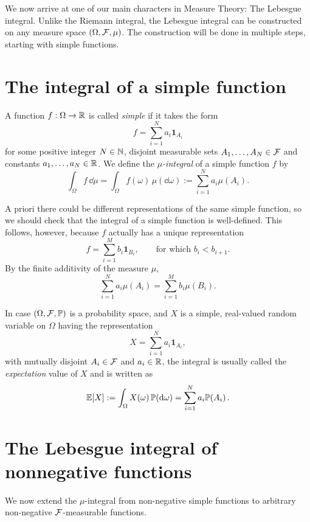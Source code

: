 We now arrive at one of our main characters in Measure Theory: The Lebesgue integral. Unlike the Riemann integral, the Lebesgue integral can be constructed on any measure space $(\Omega,\mathcal F,\mu)$. The construction will be done in multiple steps, starting with simple functions.

\section{The integral of a simple function}\label{sec:integral_simple_functions}

\begin{definition}
	A function $f: \Omega \to \mathbb R$ is called \emph{simple} if it takes the form
	\[
	f = \sum_{i=1}^N a_i \mathbf{1}_{A_i}
	\]
	for some positive integer $N \in \mathbb N$, disjoint measurable sets $A_1, \ldots, A_N \in \mathcal F$ and constants $a_1, \dots, a_N  \in \mathbb R$. We define the \emph{$\mu$-integral} of a simple function $f$ by
	\[
		\int_\Omega f\, \dd \mu = \int_\Omega f(\omega)\,\mu(\dd\omega) := \sum_{i = 1}^N a_i \mu(A_i).
	\]
\end{definition}

A priori there could be different representations of the same simple function, so we should check that the integral of a simple function is well-defined. 
This follows, however, because $f$ actually has a unique representation 
\[
	f = \sum_{i=1}^M b_i \mathbf{1}_{B_i},\qquad \text{for which $b_i < b_{i+1}$}.
\]
By the finite additivity of the measure $\mu$,
\[
\sum_{i=1}^N a_i \mu(A_i) = \sum_{i=1}^M b_i \mu(B_i).
\]

\begin{remark}
	In case $(\Omega, \mathcal F, \mathbb P)$ is a probability space, and $X$ is a simple, real-valued random variable on $\Omega$ having the representation
\[
	X = \sum_{i=1}^N a_i \mathbf{1}_{A_i},
\]
with mutually disjoint $A_i \in \mathcal F$ and $a_i \in \mathbb R$, the integral is usually called the \emph{expectation} value of $X$ and is written as
\[
	\mathbb E\!\left[X\right] := \int_\Omega X(\omega)\, \mathbb P(\mathrm{d}\omega) = \sum_{i=1}^N a_i \mathbb P\!\left(A_i\right).
\]

\end{remark}

\section{The Lebesgue integral of nonnegative functions}

We now extend the $\mu$-integral from non-negative simple functions to arbitrary non-negative $\mathcal F$-measurable functions.

